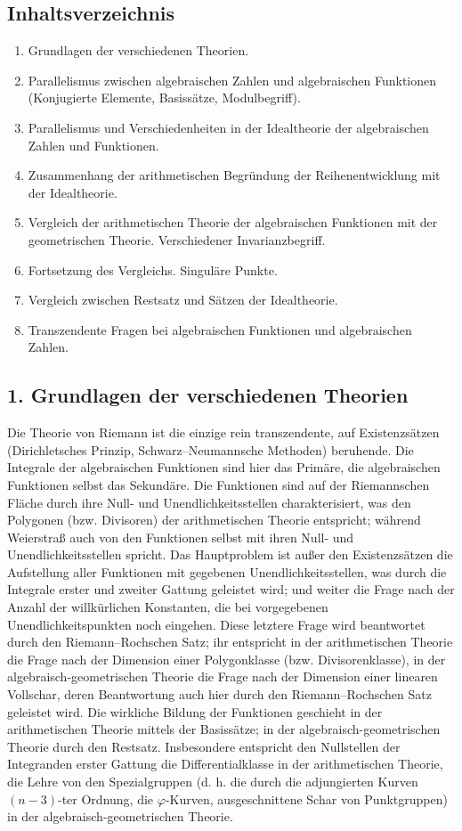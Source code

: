 \documentclass[11pt]{article}
\begin{document}
\subsection*{Inhaltsverzeichnis}
\begin{enumerate}
\item Grundlagen der verschiedenen Theorien.
\item Parallelismus zwischen algebraischen Zahlen und algebraischen Funktionen (Konjugierte Elemente, Basissätze, Modulbegriff).
\item Parallelismus und Verschiedenheiten in der Idealtheorie der algebraischen Zahlen und Funktionen.
\item Zusammenhang der arithmetischen Begründung der Reihenentwicklung mit der Idealtheorie.
\item Vergleich der arithmetischen Theorie der algebraischen Funktionen mit der geometrischen Theorie. Verschiedener Invarianzbegriff.
\item Fortsetzung des Vergleichs. Singuläre Punkte.
\item Vergleich zwischen Restsatz und Sätzen der Idealtheorie.
\item Transzendente Fragen bei algebraischen Funktionen und algebraischen Zahlen.
\end{enumerate}

\subsection*{1. Grundlagen der verschiedenen Theorien}
Die Theorie von Riemann ist die einzige rein transzendente, auf Existenzsätzen (Dirichletsches Prinzip, Schwarz--Neumannsche Methoden) beruhende. Die Integrale der algebraischen Funktionen sind hier das Primäre, die algebraischen Funktionen selbst das Sekundäre. Die Funktionen sind auf der Riemannschen Fläche durch ihre Null- und Unendlichkeitsstellen charakterisiert, was den Polygonen (bzw. Divisoren) der arithmetischen Theorie entspricht; während Weierstraß auch von den Funktionen selbst mit ihren Null- und Unendlichkeitsstellen spricht. Das Hauptproblem ist außer den Existenzsätzen die Aufstellung aller Funktionen mit gegebenen Unendlichkeitsstellen, was durch die Integrale erster und zweiter Gattung geleistet wird; und weiter die Frage nach der Anzahl der willkürlichen Konstanten, die bei vorgegebenen Unendlichkeitspunkten noch eingehen. Diese letztere Frage wird beantwortet durch den Riemann--Rochschen Satz; ihr entspricht in der arithmetischen Theorie die Frage nach der Dimension einer Polygonklasse (bzw. Divisorenklasse), in der algebraisch-geometrischen Theorie die Frage nach der Dimension einer linearen Vollschar, deren Beantwortung auch hier durch den Riemann--Rochschen Satz geleistet wird. Die wirkliche Bildung der Funktionen geschieht in der arithmetischen Theorie mittels der Basissätze; in der algebraisch-geometrischen Theorie durch den Restsatz. Insbesondere entspricht den Nullstellen der Integranden erster Gattung die Differentialklasse in der arithmetischen Theorie, die Lehre von den Spezialgruppen (d. h. die durch die adjungierten Kurven \((n-3)\)-ter Ordnung, die \(\varphi\)-Kurven, ausgeschnittene Schar von Punktgruppen) in der algebraisch-geometrischen Theorie.
\end{document}
